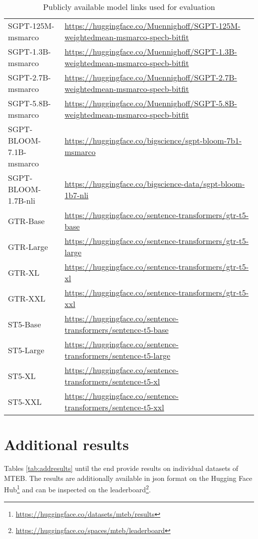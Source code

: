 \documentclass[11pt]{article}
\begin{document}
\begin{table*}[!t]
{\begin{tabular}{l|l}
SGPT-125M-msmarco & \url{https://huggingface.co/Muennighoff/SGPT-125M-weightedmean-msmarco-specb-bitfit} \\
SGPT-1.3B-msmarco & \url{https://huggingface.co/Muennighoff/SGPT-1.3B-weightedmean-msmarco-specb-bitfit} \\
SGPT-2.7B-msmarco & \url{https://huggingface.co/Muennighoff/SGPT-2.7B-weightedmean-msmarco-specb-bitfit} \\
SGPT-5.8B-msmarco & \url{https://huggingface.co/Muennighoff/SGPT-5.8B-weightedmean-msmarco-specb-bitfit} \\
SGPT-BLOOM-7.1B-msmarco & \url{https://huggingface.co/bigscience/sgpt-bloom-7b1-msmarco} \\
SGPT-BLOOM-1.7B-nli & \url{https://huggingface.co/bigscience-data/sgpt-bloom-1b7-nli} \\
GTR-Base & \url{https://huggingface.co/sentence-transformers/gtr-t5-base} \\
GTR-Large & \url{https://huggingface.co/sentence-transformers/gtr-t5-large} \\
GTR-XL & \url{https://huggingface.co/sentence-transformers/gtr-t5-xl} \\
GTR-XXL & \url{https://huggingface.co/sentence-transformers/gtr-t5-xxl} \\
ST5-Base & \url{https://huggingface.co/sentence-transformers/sentence-t5-base} \\
ST5-Large & \url{https://huggingface.co/sentence-transformers/sentence-t5-large} \\
ST5-XL & \url{https://huggingface.co/sentence-transformers/sentence-t5-xl} \\
ST5-XXL & \url{https://huggingface.co/sentence-transformers/sentence-t5-xxl} \\
    \bottomrule
    \end{tabular}}
    \caption{Publicly available model links used for evaluation}
    \label{tab:ckpts}
\end{table*}





\section{Additional results}
\label{sec:addresults}


Tables \ref{tab:addresults} until the end provide results on individual datasets of MTEB. The results are additionally available in json format on the Hugging Face Hub\footnote{\url{https://huggingface.co/datasets/mteb/results}} and can be inspected on the leaderboard\footnote{\url{https://huggingface.co/spaces/mteb/leaderboard}}.
\end{document}
